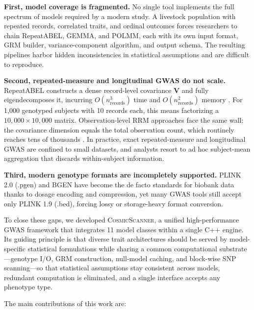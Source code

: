 \documentclass[11pt,a4paper]{article}
\newcommand{\CosmicScanner}{\textsc{CosmicScanner}}
\begin{document}
\textbf{First, model coverage is fragmented.} No single tool implements the full spectrum of models required by a modern study. A livestock population with repeated records, correlated traits, and ordinal outcomes forces researchers to chain RepeatABEL, GEMMA, and POLMM, each with its own input format, GRM builder, variance-component algorithm, and output schema. The resulting pipelines harbor hidden inconsistencies in statistical assumptions and are difficult to reproduce.

\textbf{Second, repeated-measure and longitudinal GWAS do not scale.} RepeatABEL constructs a dense record-level covariance $\mathbf{V}$ and fully eigendecomposes it, incurring $O(n_{\text{records}}^3)$ time and $O(n_{\text{records}}^2)$ memory \citep{ronnegard2010}. For 1,000 genotyped subjects with 10 records each, this means factorizing a $10{,}000 \times 10{,}000$ matrix. Observation-level RRM approaches face the same wall: the covariance dimension equals the total observation count, which routinely reaches tens of thousands \citep{zhang2020gmat}. In practice, exact repeated-measure and longitudinal GWAS are confined to small datasets, and analysts resort to ad hoc subject-mean aggregation that discards within-subject information.

\textbf{Third, modern genotype formats are incompletely supported.} PLINK 2.0 (.pgen) and BGEN have become the de facto standards for biobank data thanks to dosage encoding and compression, yet many GWAS tools still accept only PLINK 1.9 (.bed), forcing lossy or storage-heavy format conversion.

To close these gaps, we developed \CosmicScanner, a unified high-performance GWAS framework that integrates 11 model classes within a single C++ engine. Its guiding principle is that diverse trait architectures should be served by model-specific statistical formulations while sharing a common computational substrate---genotype I/O, GRM construction, null-model caching, and block-wise SNP scanning---so that statistical assumptions stay consistent across models, redundant computation is eliminated, and a single interface accepts any phenotype type.

The main contributions of this work are:
\end{document}
